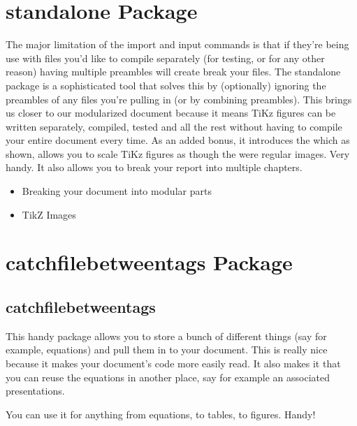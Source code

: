 \documentclass[hidelinks, float=false, crop=false]{standalone}
\begin{document}
    \section{standalone Package}
        The major limitation of the import and input commands is that if they're being use with files you'd like to compile separately (for testing, or for any other reason) having multiple preambles will create break your files.
        The standalone package is a sophisticated tool that solves this by (optionally) ignoring the preambles of any files you're pulling in (or by combining preambles).
        This brings us closer to our modularized document because it means TiKz figures can be written separately, compiled, tested and all the rest without having to compile your entire document every time.
        As an added bonus, it introduces the \texttt{} which as shown, allows you to scale TiKz figures as though the were regular images.
        Very handy.
        It also allows you to break your report into multiple chapters.
        \begin{itemize}
            \item Breaking your document into modular parts
            \item TikZ Images
        \end{itemize}
    \section{catchfilebetweentags Package}
        \subsection{catchfilebetweentags}
            This handy package allows you to store a bunch of different things (say for example, equations) and pull them in to your document. This is really nice because it makes your document's code more easily read. It also makes it that you can reuse the equations in another place, say for example an associated presentations.

            You can use it for anything from equations,
            to tables,
            to figures.
            Handy!

    \clearpage
    \standaloneBib
\end{document}
